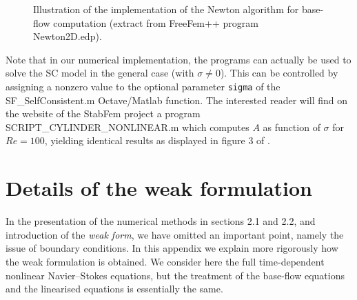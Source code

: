\documentclass[twocolumn,10pt]{asme2ej}
\begin{document}
\begin{figure*}[t]
\small

 \normalsize
\caption{Illustration of the implementation of the Newton algorithm for base-flow computation (extract from FreeFem++ program {\sf  Newton2D.edp}).}
\label{Listing3}
\end{figure*}



Note that in our numerical implementation, the programs can actually be used to solve the SC model in the general case (with $\sigma\ne0$). 
This can be controlled by assigning a nonzero value to the optional parameter \verb|sigma| of the  {\sf SF\_SelfConsistent.m} Octave/Matlab function. The interested reader will find on the website of the {\sf  StabFem} project a program {\sf SCRIPT\_CYLINDER\_NONLINEAR.m} which computes $A$ as function of $\sigma$ for $Re=100$, yielding identical results as displayed in figure 3 of \cite{MLugo2014}.

\section{Details of the weak formulation}

In the presentation of the numerical methods in sections 2.1 and 2.2, and introduction of the {\em weak form}, we have omitted an important point, namely the issue of boundary conditions. In this appendix we explain more rigorously how the weak formulation is obtained. We consider here the full time-dependent nonlinear Navier--Stokes equations, but the treatment of the base-flow equations and the linearised equations is essentially the same.
\end{document}
